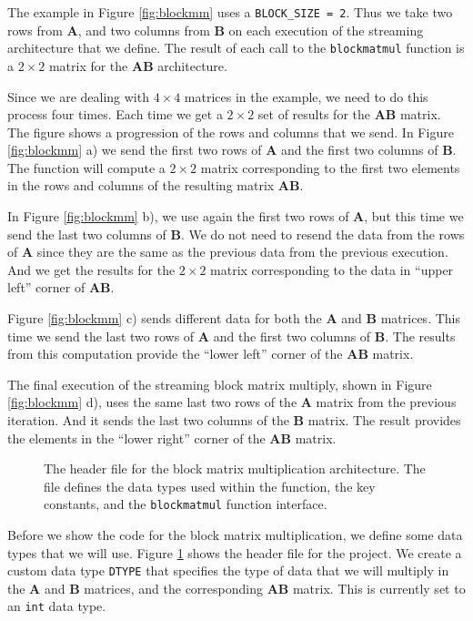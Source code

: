 The example in Figure \ref{fig:blockmm} uses a \lstinline{BLOCK_SIZE = 2}. Thus we take two rows from $\mathbf{A}$, and two columns from $\mathbf{B}$  on each execution of the streaming architecture that we define. The result of each call to the \lstinline{blockmatmul} function is a $2 \times 2$ matrix for the $\mathbf{AB}$ architecture.

Since we are dealing with $4 \times 4$ matrices in the example, we need to do this process four times. Each time we get a $2 \times 2$ set of results for the $\mathbf{AB}$ matrix. The figure shows a progression of the rows and columns that we send. In Figure \ref{fig:blockmm} a) we send the first two rows of $\mathbf{A}$ and the first two columns of $\mathbf{B}$. The function will compute a $2 \times 2$ matrix corresponding to the first two elements in the rows and columns of the resulting matrix $\mathbf{AB}$. 

In Figure \ref{fig:blockmm} b), we use again the first two rows of $\mathbf{A}$, but this time we send the last two columns of $\mathbf{B}$. We do not need to resend the data from the rows of $\mathbf{A}$ since they are the same as the previous data from the previous execution. And we get the results for the $2 \times 2$ matrix corresponding to the data in ``upper left'' corner of $\mathbf{AB}$. 

Figure \ref{fig:blockmm} c) sends different data for both the $\mathbf{A}$ and $\mathbf{B}$ matrices. This time we send the last two rows of $\mathbf{A}$ and the first two columns of $\mathbf{B}$. The results from this computation provide the ``lower left'' corner of the $\mathbf{AB}$ matrix.

The final execution of the streaming block matrix multiply, shown in Figure \ref{fig:blockmm} d), uses the same last two rows of the $\mathbf{A}$ matrix from the previous iteration. And it sends the last two columns of the $\mathbf{B}$ matrix. The result provides the elements in the ``lower right'' corner of the $\mathbf{AB}$ matrix. 

\begin{figure}
{\footnotesize }
\caption{  The header file for the block matrix multiplication architecture. The file defines the data types used within the function, the key constants, and the \lstinline{blockmatmul} function interface.   }
\label{fig:block_mm_h}
\end{figure}

Before we show the code for the block matrix multiplication, we define some data types that we will use. Figure \ref{fig:block_mm_h} shows the header file for the project. We create a custom data type \lstinline{DTYPE} that specifies the type of data that we will multiply in the $\mathbf{A}$ and $\mathbf{B}$ matrices, and the corresponding $\mathbf{AB}$ matrix. This is currently set to an \lstinline{int} data type.


